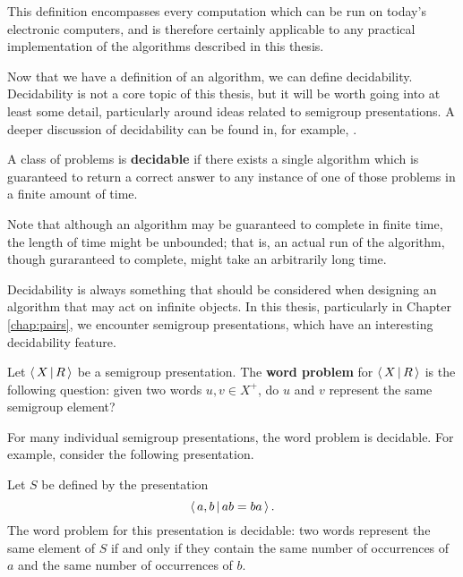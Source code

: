 This definition encompasses every computation which can be run on today's
electronic computers, and is therefore certainly applicable to any practical
implementation of the algorithms described in this thesis.

Now that we have a definition of an algorithm, we can define decidability.
Decidability is not a core topic of this thesis, but it will be worth going into
at least some detail, particularly around ideas related to semigroup
presentations.  A deeper discussion of decidability can be found in, for
example, \cite{enderton_2001}.

\begin{definition}
  \label{def:decidable}
  A class of problems is \textbf{decidable} if there exists a single algorithm
  which is guaranteed to return a correct answer to any instance of one of those
  problems in a finite amount of time.
\end{definition}

Note that although an algorithm may be guaranteed to complete in finite time,
the length of time might be unbounded; that is, an actual run of the algorithm,
though guraranteed to complete, might take an arbitrarily long time.

Decidability is always something that should be considered when designing an
algorithm that may act on infinite objects.  In this thesis, particularly in
Chapter \ref{chap:pairs}, we encounter semigroup presentations, which have an
interesting decidability feature.

\begin{definition}
  \label{def:word-problem}
  Let $\left\langle \, X \, \middle| \, R \, \right\rangle$ be a semigroup presentation.  The \textbf{word problem} for
  $\left\langle \, X \, \middle| \, R \, \right\rangle$ is the following question: given two words $u, v \in X^+$, do $u$
  and $v$ represent the same semigroup element?
\end{definition}

For many individual semigroup presentations, the word problem is decidable.  For
example, consider the following presentation.

\begin{example}
  \label{ex:presentation-decidable}
  Let $S$ be defined by the presentation
  $$\left\langle \, a,b \, \middle| \, ab=ba \, \right\rangle.$$
  The word problem for this presentation is decidable: two words represent the
  same element of $S$ if and only if they contain the same number of occurrences
  of $a$ and the same number of occurrences of $b$.
\end{example}

